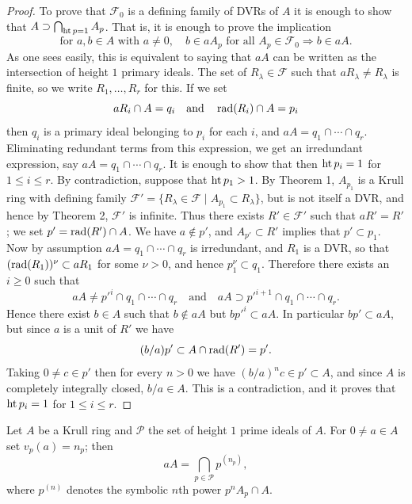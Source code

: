 \begin{proof}
To prove that $\mathcal{F}_0$ is a defining family of DVRs of $A$ it is enough to show that
$A \supset \bigcap_{\operatorname{ht} p = 1} A_p$. That is, it is enough to prove the implication
\[
  \text{for } a, b \in A \text{ with } a \neq 0, \quad b \in aA_p \text{ for all } A_p \in \mathcal{F}_0 \Rightarrow b \in aA.
\]
As one sees easily, this is equivalent to saying that $aA$ can be written as
the intersection of height $1$ primary ideals. The set of $R_\lambda \in \mathcal{F}$ such that
$aR_\lambda \neq R_\lambda$ is finite, so we write $R_1, \ldots, R_r$ for this. If we set
\[
  aR_i \cap A = q_i \quad \text{and} \quad \operatorname{rad}(R_i) \cap A = p_i
\]
then $q_i$ is a primary ideal belonging to $p_i$ for each $i$, and $aA = q_1 \cap \cdots \cap q_r$.
Eliminating redundant terms from this expression, we get an irredundant
expression, say $aA = q_1 \cap \cdots \cap q_r$. It is enough to show that then $\operatorname{ht} p_i = 1$
for $1 \le i \le r$. By contradiction, suppose that $\operatorname{ht} p_1 > 1$. By Theorem 1, $A_{p_1}$ is
a Krull ring with defining family $\mathcal{F}' = \{R_\lambda \in \mathcal{F} \mid A_{p_1} \subset R_\lambda\}$, but is not itself
a DVR, and hence by Theorem 2, $\mathcal{F}'$ is infinite. Thus there exists $R' \in \mathcal{F}'$
such that $aR' = R'$; we set $p' = \operatorname{rad}(R') \cap A$. We have $a \notin p'$, and $A_{p'} \subset R'$
implies that $p' \subset p_1$. Now by assumption $aA = q_1 \cap \cdots \cap q_r$ is irredundant, and $R_1$ is
a DVR, so that $(\operatorname{rad}(R_1))^\nu \subset aR_1$ for some $\nu > 0$, and hence $p_1^\nu \subset q_1$.
Therefore there exists an $i \ge 0$ such that
\[
  aA \neq p'^i \cap q_1 \cap \cdots \cap q_r \quad \text{and} \quad aA \supset p'^{i+1} \cap q_1 \cap \cdots \cap q_r.
\]
Hence there exist $b \in A$ such that $b \notin aA$ but $bp'^i \subset aA$. In particular $bp' \subset aA$,
but since $a$ is a unit of $R'$ we have
\[
  (b/a)p' \subset A \cap \operatorname{rad}(R') = p'.
\]
Taking $0 \neq c \in p'$ then for every $n > 0$ we have $(b/a)^nc \in p' \subset A$, and since $A$ is
completely integrally closed, $b/a \in A$. This is a contradiction, and it proves
that $\operatorname{ht} p_i = 1$ for $1 \le i \le r$.
\end{proof}

\begin{corollary*}
Let $A$ be a Krull ring and $\mathcal{P}$ the set of height $1$ prime ideals of $A$.
For $0 \neq a \in A$ set $v_p(a) = n_p$; then
\[
  aA = \bigcap_{p \in \mathcal{P}} p^{(n_p)},
\]
where $p^{(n)}$ denotes the symbolic $n$th power $p^nA_p \cap A$.
\end{corollary*}

